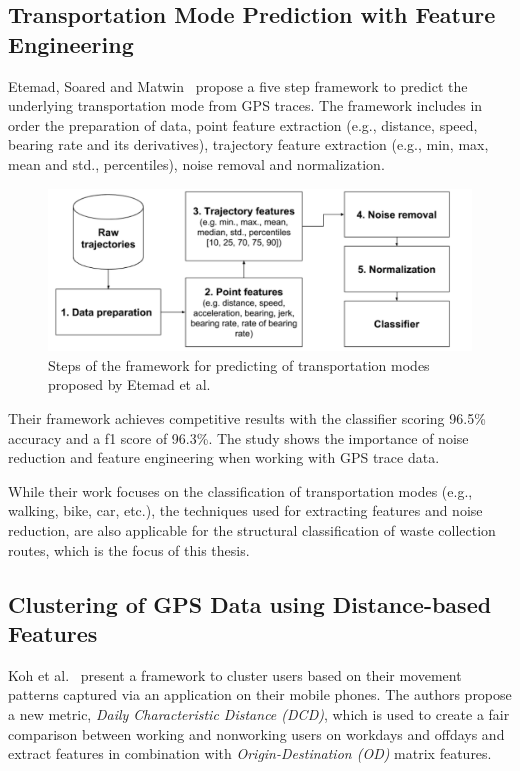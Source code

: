 \documentclass[a4paper,12pt,twoside]{scrreprt}
\begin{document}
\subsection{Transportation Mode Prediction with Feature Engineering}
Etemad, Soared and Matwin~\cite{etemad_predicting_2018} propose a five step
framework to predict the
underlying transportation mode from GPS traces. The framework
includes in order the preparation of data, point feature extraction (e.g.,
distance, speed, bearing rate and its derivatives), trajectory feature
extraction (e.g., min, max, mean and std., percentiles), noise removal and
normalization.

\begin{figure}[htbp]
  \centering
  \includegraphics[width=\textwidth]{Figures/related_work/etemad_pipeline.png}
  \caption{Steps of the framework for predicting of transportation
    modes proposed by Etemad et al.~\cite{etemad_predicting_2018}}
  \label{fig:etemad_framework_prediction}
\end{figure}
\FloatBarrier

Their framework achieves competitive results with the
classifier scoring 96.5\% accuracy and a f1 score of 96.3\%. The study shows
the
importance of noise reduction and feature engineering when working with GPS
trace data.~\cite{etemad_predicting_2018}

While their work focuses on the classification of transportation modes (e.g.,
walking, bike, car, etc.), the techniques used for extracting features and
noise reduction, are also applicable for the structural classification of waste
collection routes, which is the focus of this thesis.

\subsection{Clustering of GPS Data using Distance-based Features}
Koh et al.~\cite{koh_clustering_2022} present a framework to cluster users
based on their movement patterns captured via an application on their mobile
phones.
The authors propose a new metric, \textit{Daily Characteristic Distance
  (DCD)},
which is used to create a fair comparison between working and nonworking users
on workdays and offdays and extract features in combination with
\textit{Origin-Destination (OD)} matrix features.
\end{document}
